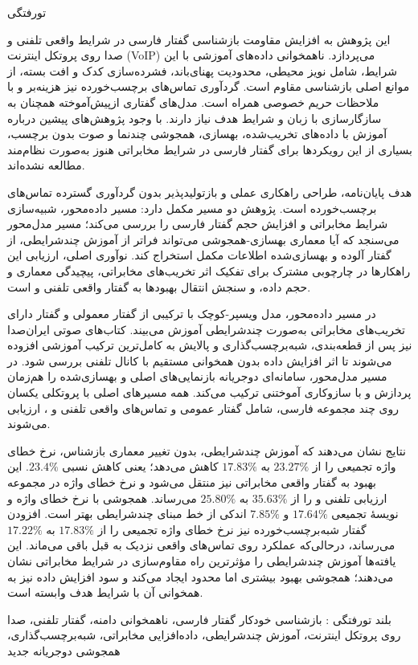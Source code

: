
‌تورفتگی

این پژوهش به افزایش مقاومت بازشناسی گفتار فارسی در شرایط واقعی تلفنی و صدا روی پروتکل اینترنت (VoIP) می‌پردازد. ناهمخوانی داده‌های آموزشی با این شرایط، شامل نویز محیطی، محدودیت پهنای‌باند، فشرده‌سازی کدک و افت بسته، از موانع اصلی بازشناسی مقاوم است. گردآوری تماس‌های برچسب‌خورده نیز هزینه‌بر و با ملاحظات حریم خصوصی همراه است. مدل‌های گفتاری ازپیش‌آموخته همچنان به سازگارسازی با زبان و شرایط هدف نیاز دارند. با وجود پژوهش‌های پیشین درباره آموزش با داده‌های تخریب‌شده، بهسازی، همجوشی چندنما و صوت بدون برچسب، بسیاری از این رویکردها برای گفتار فارسی در شرایط مخابراتی هنوز به‌صورت نظام‌مند مطالعه نشده‌اند.

هدف پایان‌نامه، طراحی راهکاری عملی و بازتولیدپذیر بدون گردآوری گسترده تماس‌های برچسب‌خورده است. پژوهش دو مسیر مکمل دارد: مسیر داده‌محور، شبیه‌سازی شرایط مخابراتی و افزایش حجم گفتار فارسی را بررسی می‌کند؛ مسیر مدل‌محور می‌سنجد که آیا معماری بهسازی-همجوشی می‌تواند فراتر از آموزش چندشرایطی، از گفتار آلوده و بهسازی‌شده اطلاعات مکمل استخراج کند. نوآوری اصلی، ارزیابی این راهکارها در چارچوبی مشترک برای تفکیک اثر تخریب‌های مخابراتی، پیچیدگی معماری و حجم داده، و سنجش انتقال بهبودها به گفتار واقعی تلفنی و  است.

در مسیر داده‌محور، مدل ویسپر-کوچک با ترکیبی از گفتار معمولی و گفتار دارای تخریب‌های مخابراتی به‌صورت چندشرایطی آموزش می‌بیند. کتاب‌های صوتی ایران‌صدا نیز پس از قطعه‌بندی، شبه‌برچسب‌گذاری و پالایش به کامل‌ترین ترکیب آموزشی افزوده می‌شوند تا اثر افزایش داده بدون همخوانی مستقیم با کانال تلفنی بررسی شود. در مسیر مدل‌محور، سامانه‌ای دوجریانه بازنمایی‌های اصلی و بهسازی‌شده را هم‌زمان پردازش و با سازوکاری آموختنی ترکیب می‌کند. همه مسیرهای اصلی با پروتکلی یکسان روی چند مجموعه فارسی، شامل گفتار عمومی و تماس‌های واقعی تلفنی و ، ارزیابی می‌شوند.

نتایج نشان می‌دهند که آموزش چندشرایطی، بدون تغییر معماری بازشناس، نرخ خطای واژه تجمیعی را از $23.27\%$ به $17.83\%$ کاهش می‌دهد؛ یعنی کاهش نسبی $23.4\%$. این بهبود به گفتار واقعی مخابراتی نیز منتقل می‌شود و نرخ خطای واژه در مجموعه ارزیابی تلفنی و  را از $35.63\%$ به $25.80\%$ می‌رساند. همجوشی با نرخ خطای واژه و نویسهٔ تجمیعی $17.64\%$ و $7.85\%$ اندکی از خط مبنای چندشرایطی بهتر است. افزودن گفتار شبه‌برچسب‌خورده نیز نرخ خطای واژه تجمیعی را از $17.83\%$ به $17.22\%$ می‌رساند، درحالی‌که عملکرد روی تماس‌های واقعی نزدیک به قبل باقی می‌ماند. این یافته‌ها آموزش چندشرایطی را مؤثرترین راه مقاوم‌سازی در شرایط مخابراتی نشان می‌دهند؛ همجوشی بهبود بیشتری اما محدود ایجاد می‌کند و سود افزایش داده نیز به همخوانی آن با شرایط هدف وابسته است.

‌بلند
‌تورفتگی :
بازشناسی خودکار گفتار فارسی، ناهمخوانی دامنه، گفتار تلفنی، صدا روی پروتکل اینترنت، آموزش چندشرایطی، داده‌افزایی مخابراتی، شبه‌برچسب‌گذاری، همجوشی دوجریانه
‌جدید
